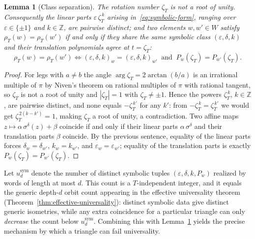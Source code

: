 \documentclass[11pt]{article}
\theoremstyle{plain}
\newtheorem{lemma}[theorem]{Lemma}
\theoremstyle{definition}
\theoremstyle{remark}
\begin{document}
\begin{lemma}[Class separation]
\label{lem:class-separation}
The rotation number $\zeta_T$ is not a root of unity. Consequently the
linear parts $\varepsilon\,\zeta_T^{\,k}$ arising
in~\eqref{eq:symbolic-form}, ranging over
$\varepsilon \in \{\pm 1\}$ and $k \in \mathbb{Z}$, are pairwise distinct;
and two elements $w, w' \in W$ satisfy $\rho_T(w) = \rho_T(w')$ if and
only if they share the same symbolic class $(\varepsilon, \delta, k)$ and
their translation polynomials agree at $t = \zeta_T$:
\begin{equation}
\label{eq:collision-criterion}
\rho_T(w) = \rho_T(w')
\iff
(\varepsilon, \delta, k)_w = (\varepsilon, \delta, k)_{w'}
\ \text{ and }\
P_w(\zeta_T) = P_{w'}(\zeta_T).
\end{equation}
\end{lemma}

\begin{proof}
For legs with $a \ne b$ the angle $\arg \zeta_T = 2\arctan(b/a)$ is an
irrational multiple of $\pi$ by Niven's theorem on rational multiples of
$\pi$ with rational tangent, so $\zeta_T$ is not a root of unity and
$|\zeta_T| = 1$ with $\zeta_T \ne \pm 1$. Hence the powers $\zeta_T^{\,k}$,
$k \in \mathbb{Z}$, are pairwise distinct, and none equals
$-\zeta_T^{\,k'}$ for any $k'$: from $-\zeta_T^{\,k} = \zeta_T^{\,k'}$ we
would get $\zeta_T^{\,2(k-k')} = 1$, making $\zeta_T$ a root of unity, a
contradiction. Two affine maps
$z \mapsto \alpha\,\sigma^{\delta}(z) + \beta$ coincide if and only if
their linear parts $\alpha\,\sigma^{\delta}$ and their translation parts
$\beta$ coincide. By the previous sentence, equality of the linear parts
forces $\delta_w = \delta_{w'}$, $k_w = k_{w'}$, and
$\varepsilon_w = \varepsilon_{w'}$; equality of the translation parts is
exactly $P_w(\zeta_T) = P_{w'}(\zeta_T)$.
\end{proof}

Let $u_d^{\mathrm{sym}}$ denote the number of distinct symbolic tuples
$(\varepsilon, \delta, k, P_w)$ realized by words of length at most $d$.
This count is a $T$-independent integer, and it equals the generic
depth-$d$ orbit count appearing in the effective universality theorem
(Theorem~\ref{thm:effective-universality}): distinct symbolic data give
distinct generic isometries, while any extra coincidence for a particular
triangle can only \emph{decrease} the count below $u_d^{\mathrm{sym}}$.
Combining this with Lemma~\ref{lem:class-separation} yields the precise
mechanism by which a triangle can fail universality.
\end{document}
